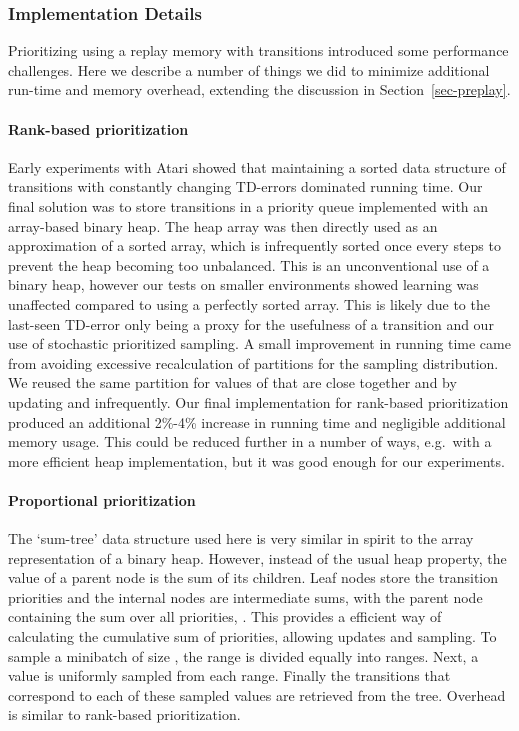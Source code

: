 \documentclass[a4paper]{article}
\begin{document}
\subsubsection{Implementation Details}
\label{app-atari-experiments-impl-details}

Prioritizing using a replay memory with  transitions introduced some performance challenges.  Here we describe a number of things we did to minimize additional run-time and memory overhead, extending the discussion in Section~\ref{sec-preplay}.

\paragraph{Rank-based prioritization} Early experiments with Atari showed that maintaining a sorted data structure of  transitions with constantly changing TD-errors dominated running time.  Our final solution  was to store transitions in a priority queue implemented with an array-based binary heap.  The heap array was then directly used as an approximation of a sorted array, which is infrequently sorted once every  steps to prevent the heap becoming too unbalanced.  This is an unconventional use of a binary heap, however our tests on smaller environments showed learning was unaffected compared to using a perfectly sorted array.  This is likely due to the last-seen TD-error only being a proxy for the usefulness of a transition and our use of stochastic prioritized sampling.  A small improvement in running time came from avoiding excessive recalculation of partitions for the sampling distribution.  We reused the same partition for values of  that are close together and by updating  and  infrequently.  Our final implementation for rank-based prioritization produced an additional 2\%-4\% increase in running time and negligible additional memory usage.  This could be reduced further in a number of ways, e.g.\ with a more efficient heap implementation, but it was good enough for our experiments.

\paragraph{Proportional prioritization}
The `sum-tree' data structure used here is very similar in spirit to the array representation of a binary heap.  However, instead of the usual heap property, the value of a parent node is the sum of its children.  Leaf nodes store the transition priorities and the internal nodes are intermediate sums, with the parent node containing the sum over all priorities, .  This provides a efficient way of calculating the cumulative sum of priorities, allowing  updates and sampling.  To sample a minibatch of size , the range  is divided equally into  ranges.  Next, a value is uniformly sampled from each range.  Finally the transitions that correspond to each of these sampled values are retrieved from the tree.  Overhead is similar to rank-based prioritization.
\end{document}

